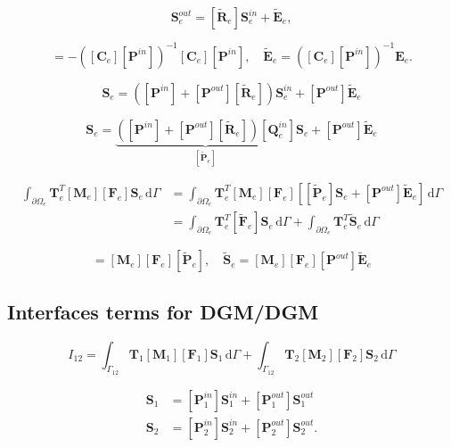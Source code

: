 \documentclass[11pt,A4paper]{book}
\newcommand{\ds}{\displaystyle}
\newcommand{\tb}{\textbf}
\newcommand{\tp}{^T}
\newcommand{\esp}{, \quad}
\newcommand{\p}{\partial}
\newcommand{\wdt}[1]{\widetilde{#1}}
\renewcommand{\d}{\,\textrm{d}}
\renewcommand{\:}{\tb{:}}
\begin{document}
\begin{equation}
\tb{S}_e^{out}=[\wdt{\tb{R}}_e]\tb{S}_e^{in}+\wdt{\tb{E}}_e,
\end{equation}

\begin{equation}
[\wdt{\tb{R}}_e]=-\left([\tb{C}_e][\tb{P}^{in}]\right)^{-1}[\tb{C}_e][\tb{P}^{in}] \esp 
\wdt{\tb{E}}_e=\left([\tb{C}_e][\tb{P}^{in}]\right)^{-1}\tb{E}_e.
\end{equation}


\begin{equation}
	\tb{S}_e=\left([\tb{P}^{in}]+[\tb{P}^{out}][\wdt{\tb{R}}_e]\right) \tb{S}_e^{in}+[\tb{P}^{out}]\wdt{\tb{E}}_e
\end{equation}


\begin{equation}
	\tb{S}_e=\underbrace{\left([\tb{P}^{in}]+[\tb{P}^{out}][\wdt{\tb{R}}_e]\right) [\tb{Q}_e^{in}]}_{[\wdt{\tb{P}}_e]}\tb{S}_e+[\tb{P}^{out}]\wdt{\tb{E}}_e
\end{equation}


\begin{align}
\ds{\int_{\p\Omega_e}} 
\tb{T}_e\tp [\tb{M}_e][\tb{F}_e]\tb{S}_e \d\Gamma
&=\ds{\int_{\p\Omega_e}} 
\tb{T}_e\tp [\tb{M}_e] [\tb{F}_e] \left[
[\wdt{\tb{P}}_e]\tb{S}_e+[\tb{P}^{out}]\wdt{\tb{E}}_e\right]\d\Gamma\\
&=\ds{\int_{\p\Omega_e}} 
\tb{T}_e\tp [\wdt{\tb{F}}_e] \tb{S}_e\d\Gamma +
\ds{\int_{\p\Omega_e}}  \tb{T}_e\tp \wdt{\tb{S}}_e\d\Gamma
\end{align}

\begin{equation}
[\wdt{\tb{F}}_e]=[\tb{M}_e] [\tb{F}_e] 
[\wdt{\tb{P}}_e] \esp 	\wdt{\tb{S}}_e=[\tb{M}_e] [\tb{F}_e][\tb{P}^{out}]\wdt{\tb{E}}_e
\end{equation}



\subsection{Interfaces terms for DGM/DGM}


\begin{equation}
I_{12}=
\ds{\int_{\Gamma_{12}}} 
\tb{T}_1 [\tb{M}_1][\tb{F}_1]\tb{S}_1 \d\Gamma +
\ds{\int_{\Gamma_{12}}} 
\tb{T}_2 [\tb{M}_2][\tb{F}_2]\tb{S}_2 \d\Gamma 
\end{equation}




\begin{align}
	\tb{S}_1&=[\tb{P}^{in}_1]\tb{S}^{in}_1+[\tb{P}^{out}_1]\tb{S}_1^{out}\\
	\tb{S}_2&=[\tb{P}^{in}_2]\tb{S}^{in}_2+[\tb{P}^{out}_2]\tb{S}_2^{out}.	
\end{align}
\end{document}
